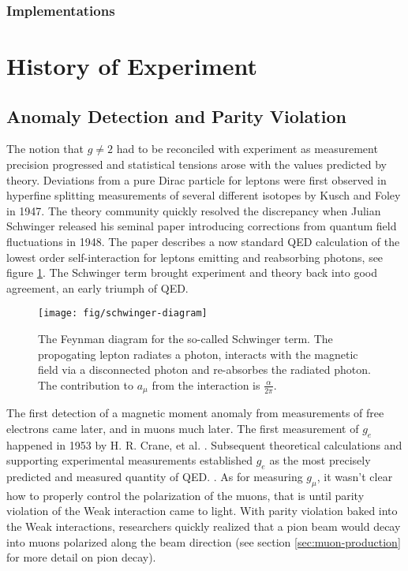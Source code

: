 \subsubsection{Implementations}


\section{History of Experiment} \label{sec:history-expt}

\subsection{Anomaly Detection and Parity Violation}

The notion that $g \ne 2$ had to be reconciled with experiment as measurement precision progressed and statistical tensions arose with the values predicted by theory.  Deviations from a pure Dirac particle for leptons were first observed in hyperfine splitting measurements of several different isotopes by Kusch and Foley in 1947\cite{kusch-foley}.  The theory community quickly resolved the discrepancy when Julian Schwinger released his seminal paper introducing corrections from quantum field fluctuations in 1948\cite{schwinger}.  The paper describes a now standard QED calculation of the lowest order self-interaction for leptons emitting and reabsorbing photons, see figure \ref{fig:schwinger-diagram}.  The Schwinger term brought experiment and theory back into good agreement, an early triumph of QED.

\begin{figure}
\label{fig:schwinger-diagram}
\centering
\texttt{[image: fig/schwinger-diagram]}
\caption{The Feynman diagram for the so-called Schwinger term. The propogating lepton radiates a photon, interacts with the magnetic field via a disconnected photon and re-absorbes the radiated photon.  The contribution to $a_\mu$ from the interaction is $\frac{\alpha}{2\pi}$.}
\end{figure}

The first detection of a magnetic moment anomaly from measurements of free electrons came later, and in muons much later.  The first measurement of $g_e$ happened in 1953 by H. R. Crane, et al. .  Subsequent theoretical calculations and supporting experimental measurements established $g_e$ as the most precisely predicted and measured quantity of QED.  .  As for measuring $g_\mu$, it wasn't clear how to properly control the polarization of the muons, that is until parity violation of the Weak interaction came to light.  With parity violation baked into the Weak interactions, researchers quickly realized that a pion beam would decay into muons polarized along the beam direction (see section \ref{sec:muon-production} for more detail on pion decay).

